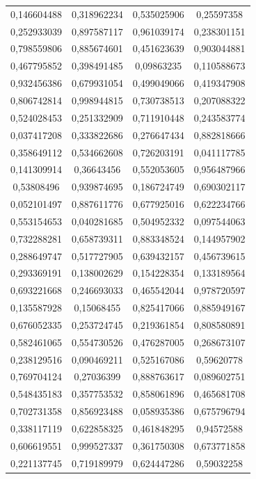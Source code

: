 \documentclass[a4paper,12pt]{article}
\begin{document}
\begin{longtable}{|c|c|c|c|}
  0,146604488 & 0,318962234 & 0,535025906 & 0,25597358 \\
  0,252933039 & 0,897587117 & 0,961039174 & 0,238301151 \\
  0,798559806 & 0,885674601 & 0,451623639 & 0,903044881 \\
  0,467795852 & 0,398491485 & 0,09863235 & 0,110588673 \\
  0,932456386 & 0,679931054 & 0,499049066 & 0,419347908 \\
  0,806742814 & 0,998944815 & 0,730738513 & 0,207088322 \\
  0,524028453 & 0,251332909 & 0,711910448 & 0,243583774 \\
  0,037417208 & 0,333822686 & 0,276647434 & 0,882818666 \\
  0,358649112 & 0,534662608 & 0,726203191 & 0,041117785 \\
  0,141309914 & 0,36643456 & 0,552053605 & 0,956487966 \\
  0,53808496 & 0,939874695 & 0,186724749 & 0,690302117 \\
  0,052101497 & 0,887611776 & 0,677925016 & 0,622234766 \\
  0,553154653 & 0,040281685 & 0,504952332 & 0,097544063 \\
  0,732288281 & 0,658739311 & 0,883348524 & 0,144957902 \\
  0,288649747 & 0,517727905 & 0,639432157 & 0,456739615 \\
  0,293369191 & 0,138002629 & 0,154228354 & 0,133189564 \\
  0,693221668 & 0,246693033 & 0,465542044 & 0,978720597 \\
  0,135587928 & 0,15068455 & 0,825417066 & 0,885949167 \\
  0,676052335 & 0,253724745 & 0,219361854 & 0,808580891 \\
  0,582461065 & 0,554730526 & 0,476287005 & 0,268673107 \\
  0,238129516 & 0,090469211 & 0,525167086 & 0,59620778 \\
  0,769704124 & 0,27036399 & 0,888763617 & 0,089602751 \\
  0,548435183 & 0,357753532 & 0,858061896 & 0,465681708 \\
  0,702731358 & 0,856923488 & 0,058935386 & 0,675796794 \\
  0,338117119 & 0,622858325 & 0,461848295 & 0,94572588 \\
  0,606619551 & 0,999527337 & 0,361750308 & 0,673771858 \\
  0,221137745 & 0,719189979 & 0,624447286 & 0,59032258 \\

\end{longtable}
\end{document}
